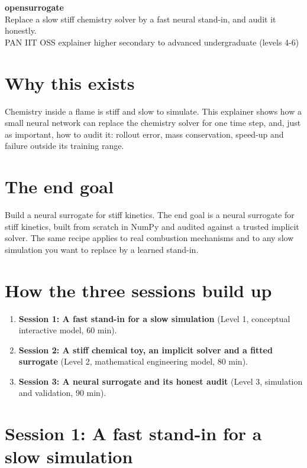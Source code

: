 \documentclass[11pt,a4paper]{article}
\begin{document}
\begin{center}{\LARGE\bfseries opensurrogate}\\[0.4em]{\large Replace a slow stiff chemistry solver by a fast neural stand-in, and audit it honestly.}\\[0.2em]\small PAN IIT OSS explainer \textbullet{} higher secondary to advanced undergraduate (levels 4-6)\end{center}

\section*{Why this exists}
Chemistry inside a flame is stiff and slow to simulate. This explainer shows how a small neural network can replace the chemistry solver for one time step, and, just as important, how to audit it: rollout error, mass conservation, speed-up and failure outside its training range.

\section*{The end goal}
Build a neural surrogate for stiff kinetics. The end goal is a neural surrogate for stiff kinetics, built from scratch in NumPy and audited against a trusted implicit solver. The same recipe applies to real combustion mechanisms and to any slow simulation you want to replace by a learned stand-in.

\section*{How the three sessions build up}
\begin{enumerate}[nosep]
\item \textbf{Session 1: A fast stand-in for a slow simulation} (Level 1, conceptual interactive model, 60 min).
\item \textbf{Session 2: A stiff chemical toy, an implicit solver and a fitted surrogate} (Level 2, mathematical engineering model, 80 min).
\item \textbf{Session 3: A neural surrogate and its honest audit} (Level 3, simulation and validation, 90 min).
\end{enumerate}

\section{Session 1: A fast stand-in for a slow simulation}
\end{document}
